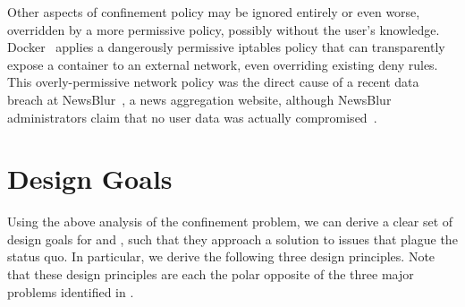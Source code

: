 Other aspects of confinement policy may be ignored entirely or even worse, overridden by
a more permissive policy, possibly without the user's knowledge.
Docker~\cite{docker_security} applies a dangerously permissive iptables policy that can
transparently expose a container to an external network, even overriding existing deny
rules. This overly-permissive network policy was the direct cause of a recent data breach
at NewsBlur~\cite{newsblur}, a news aggregation website, although NewsBlur administrators
claim that no user data was actually compromised~\cite{newsblur}. 



\section{Design Goals}%
\label{s:cp-design}

Using the above analysis of the confinement problem, we can derive a clear set of design
goals for \bpfbox{} and \bpfcontain{}, such that they approach a solution to issues that
plague the status quo. In particular, we derive the following three design principles.
Note that these design principles are each the polar opposite of the three major problems
identified in .

